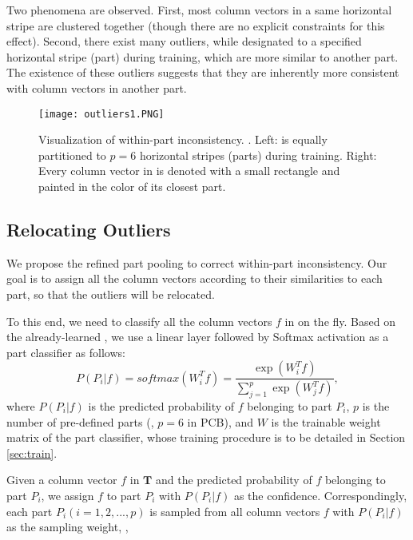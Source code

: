 \documentclass[10pt,twocolumn,letterpaper]{article}
\begin{document}
Two phenomena are observed. First, most column vectors in a same horizontal stripe are clustered together (though there are no explicit constraints for this effect). Second, there exist many outliers, while designated to a specified horizontal stripe (part) during training, which are more similar to another part. The existence of these outliers suggests that they are inherently more consistent with column vectors in another part.  
\begin{figure}[t]
\setlength{\abovecaptionskip}{-0.1cm} 
\setlength{\belowcaptionskip}{-0.2cm}
\begin{center}
\texttt{[image: outliers1.PNG]}
\end{center}
   \caption{Visualization of within-part inconsistency. . Left:  is equally partitioned to $p=6$ horizontal stripes (parts) during training. Right: Every column vector in  is denoted with a small rectangle and painted in the color of its closest part.}
\label{fig:outlier}
\end{figure}

\subsection{Relocating Outliers}\label{sec:relocate}
We propose the refined part pooling to correct within-part inconsistency. Our goal is to assign all the column vectors according to their similarities to each part, so that the outliers will be relocated.  

To this end, we need to classify all the column vectors $f$ in  on the fly. Based on the already-learned , we use a linear layer followed by Softmax activation as a part classifier as follows:
\begin{equation}\label{eq:classifier} 
P(P_i|f)=softmax(W_i^Tf)=\frac{\exp(W_i^Tf)}{\sum\limits_{j=1}^p\exp(W_j^Tf)},
\end{equation}
where $P(P_i|f)$ is the predicted probability of $f$ belonging to part $P_i$, $p$ is the number of pre-defined parts (\ie, $p=6$ in PCB), and $W$ is the trainable weight matrix of the part classifier, whose training procedure is to be detailed in Section \ref{sec:train}. 

Given a column vector $f$ in $\bm T$ and the predicted probability of $f$ belonging to part $P_i$, we assign $f$ to part $P_i$ with $P(P_i|f)$ as the confidence. Correspondingly, each part $P_i(i=1,2,...,p)$ is sampled from all column vectors $f$ with $P(P_i|f)$ as the sampling weight, \ie,
\end{document}
